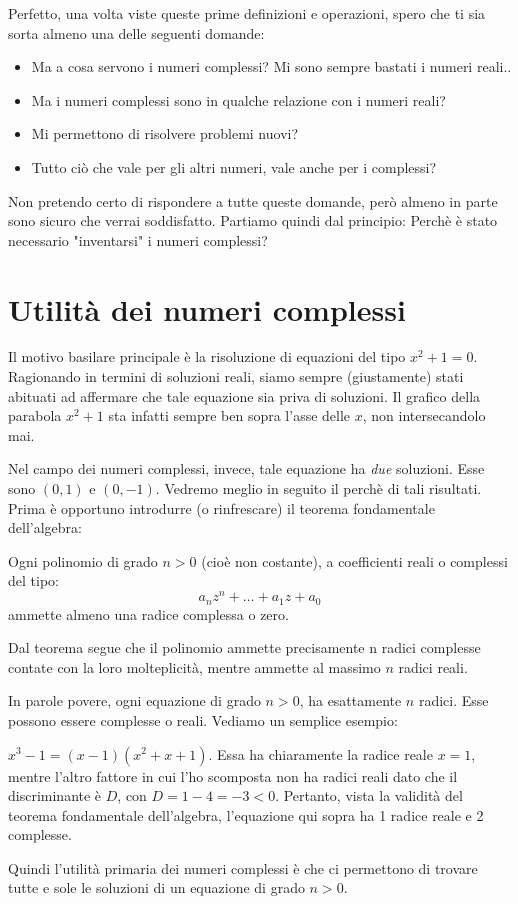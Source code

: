 Perfetto, una volta viste queste prime definizioni e operazioni, spero che ti sia sorta almeno una delle seguenti domande:
\begin{itemize}
	\item Ma a cosa servono i numeri complessi? Mi sono sempre bastati i numeri reali..
	\item Ma i numeri complessi sono in qualche relazione con i numeri reali?
	\item Mi permettono di risolvere problemi nuovi?
	\item Tutto ciò che vale per gli altri numeri, vale anche per i complessi?
\end{itemize}
Non pretendo certo di rispondere a tutte queste domande, però almeno in parte sono sicuro che verrai soddisfatto. 
Partiamo quindi dal principio: Perchè è stato necessario "inventarsi" i numeri complessi?

\section{Utilità dei numeri complessi}
Il motivo basilare principale è la risoluzione di equazioni del tipo $ x^2+1=0 $. Ragionando in termini di soluzioni reali, siamo sempre (giustamente) stati abituati ad affermare che tale equazione sia priva di soluzioni. Il grafico della parabola $ x^2+1 $ sta infatti sempre ben sopra l'asse delle $ x $, non intersecandolo mai.

Nel campo dei numeri complessi, invece, tale equazione ha \emph{due} soluzioni. Esse sono $ (0,1) $ e $ (0,-1) $. Vedremo meglio in seguito il perchè di tali risultati. Prima è opportuno introdurre (o rinfrescare) il teorema fondamentale dell'algebra:

\begin{thm}
	Ogni polinomio di grado $ n>0 $ (cioè non costante), a coefficienti reali o complessi del tipo:
	\begin{equation}
	a_{n}z^{n}+\ldots +a_{1}z+a_{0}
	\end{equation}
	ammette almeno una radice complessa o zero.
\end{thm} 
Dal teorema segue che il polinomio ammette precisamente n radici complesse contate con la loro molteplicità, mentre ammette al massimo $ n $ radici reali.

In parole povere, ogni equazione di grado $ n>0 $, ha esattamente $ n $ radici. Esse possono essere complesse o reali. Vediamo un semplice esempio:
\begin{exmpl}
	$ x^3-1 = (x-1)(x^2 + x + 1) $. Essa ha chiaramente la radice reale $ x=1 $, mentre l'altro fattore in cui l'ho scomposta non ha radici reali dato che il discriminante è $ D $, con $ D = 1 - 4 = -3<0 $. Pertanto, vista la validità del teorema fondamentale dell'algebra, l'equazione qui sopra ha 1 radice reale e 2 complesse.
\end{exmpl}
Quindi l'utilità primaria dei numeri complessi è che ci permettono di trovare tutte e sole le soluzioni di un equazione di grado $ n>0 $.
